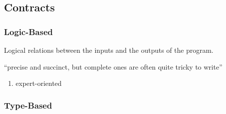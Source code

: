 
\subsection{Contracts}

\subsubsection{Logic-Based}
Logical relations between the inputs and the outputs of the program.

``precise and succinct, but complete ones are often quite tricky to write''

\begin{enumerate}
\item expert-oriented
\end{enumerate}

\subsubsection{Type-Based}



